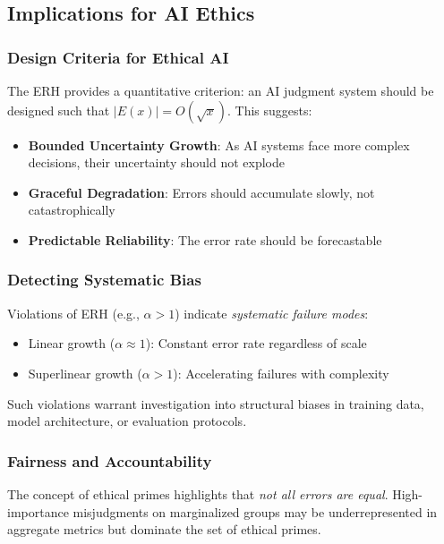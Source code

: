\documentclass[12pt,a4paper]{article}
\theoremstyle{definition}
\theoremstyle{remark}
\begin{document}
\subsection{Implications for AI Ethics}
\label{sec:implications}

\subsubsection{Design Criteria for Ethical AI}

The ERH provides a quantitative criterion: an AI judgment system should be designed such that $|E(x)| = O(\sqrt{x})$. This suggests:

\begin{itemize}
    \item \textbf{Bounded Uncertainty Growth}: As AI systems face more complex decisions, their uncertainty should not explode
    \item \textbf{Graceful Degradation}: Errors should accumulate slowly, not catastrophically
    \item \textbf{Predictable Reliability}: The error rate should be forecastable
\end{itemize}

\subsubsection{Detecting Systematic Bias}

Violations of ERH (e.g., $\alpha > 1$) indicate \emph{systematic failure modes}:
\begin{itemize}
    \item Linear growth ($\alpha \approx 1$): Constant error rate regardless of scale
    \item Superlinear growth ($\alpha > 1$): Accelerating failures with complexity
\end{itemize}

Such violations warrant investigation into structural biases in training data, model architecture, or evaluation protocols.

\subsubsection{Fairness and Accountability}

The concept of ethical primes highlights that \emph{not all errors are equal}. High-importance misjudgments on marginalized groups may be underrepresented in aggregate metrics but dominate the set of ethical primes.
\end{document}
